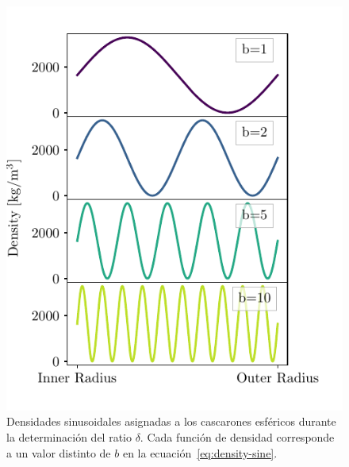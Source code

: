\begin{figure}
\centering
\includegraphics[width=0.5\linewidth]{figs/tesseroids-variable-density/sine-densities.pdf}
\caption{
    Densidades sinusoidales asignadas a los cascarones esféricos durante la
    determinación del ratio $\delta$. Cada función de densidad corresponde a un
    valor distinto de $b$ en la ecuación~\ref{eq:density-sine}.
}
\label{fig:sine-densities}
\end{figure}

